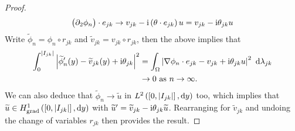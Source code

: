 \begin{proof}
\begin{align*}
\begin{pmatrix}
			\partial_2\phi_n
		\end{pmatrix}
		\cdot e_{jk}
		\rightarrow v_{jk} - \mathrm{i}\left( \theta\cdot e_{jk} \right)u = v_{jk} - \mathrm{i}\theta_{jk}u
	\end{align*}
	Write $\widetilde{\phi}_n = \phi_n\circ r_{jk}$ and $\widetilde{v}_{jk}=v_{jk}\circ r_{jk}$, then the above implies that
	\begin{align*}
		\int_0^{\left\lvert I_{jk} \right\rvert} \left\lvert  \widetilde{\phi}_n'(y) - \widetilde{v}_{jk}(y) + \mathrm{i}\theta_{jk}   \right\rvert^2
		&= \int_{\Omega} \left\lvert  \nabla\phi_n\cdot e_{jk} - v_{jk} + \mathrm{i}\theta_{jk}u  \right\rvert^2  \ \mathrm{d}\lambda_{jk} \\
		&\rightarrow 0 \ \text{as} \ n \rightarrow\infty.
	\end{align*}
	We can also deduce that $\widetilde{\phi}_n\rightarrow \widetilde{u}$ in $L^{2}\left( \left[ 0,\left\lvert I_{jk} \right\rvert \right],\mathrm{d}y \right)$ too, which implies that $\widetilde{u}\in H^1_\mathrm{grad}\left( \left[ 0,\left\lvert I_{jk} \right\rvert \right], \mathrm{d}y \right)$ with $\widetilde{u}' = \widetilde{v}_{jk} - \mathrm{i}\theta_{jk}\widetilde{u}$.
	Rearranging for $\widetilde{v}_{jk}$ and undoing the change of variables $r_{jk}$ then provides the result.
\end{proof}

